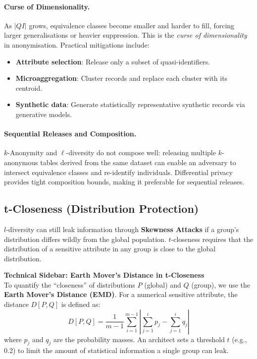 \paragraph{Curse of Dimensionality.}
As $|QI|$ grows, equivalence classes become smaller and harder to fill, forcing larger generalisations or heavier suppression. This is the \emph{curse of dimensionality} in anonymisation. Practical mitigations include:
\begin{itemize}
  \item \textbf{Attribute selection}: Release only a subset of quasi-identifiers.
  \item \textbf{Microaggregation}: Cluster records and replace each cluster with its centroid.
  \item \textbf{Synthetic data}: Generate statistically representative synthetic records via generative models.
\end{itemize}

\paragraph{Sequential Releases and Composition.}
$k$-Anonymity and $\ell$-diversity do not compose well: releasing multiple $k$-anonymous tables derived from the same dataset can enable an adversary to intersect equivalence classes and re-identify individuals. Differential privacy provides tight composition bounds, making it preferable for sequential releases.

\subsection{t-Closeness (Distribution Protection)}
$l$-diversity can still leak information through \textbf{Skewness Attacks} if a group's distribution differs wildly from the global population. $t$-closeness requires that the distribution of a sensitive attribute in any group is close to the global distribution.

\begin{svgraybox}
\textbf{Technical Sidebar: Earth Mover's Distance in t-Closeness}\\
To quantify the ``closeness'' of distributions $P$ (global) and $Q$ (group), we use the \textbf{Earth Mover's Distance (EMD)}. For a numerical sensitive attribute, the distance $D[P, Q]$ is defined as:
\begin{equation}
D[P, Q] = \frac{1}{m-1} \sum_{i=1}^{m-1} \left| \sum_{j=1}^{i} p_j - \sum_{j=1}^{i} q_j \right|
\end{equation}
where $p_j$ and $q_j$ are the probability masses. An architect sets a threshold $t$ (e.g., 0.2) to limit the amount of statistical information a single group can leak.
\end{svgraybox}

